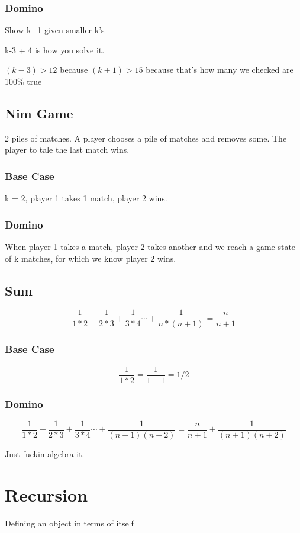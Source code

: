 \documentclass{report}
\begin{document}
\subsection{Domino}
Show k+1 given smaller k's

k-3 + 4 is how you solve it.

$(k - 3) > 12$ because $(k+1) > 15$ because that's how many we checked are 100\% true

\section{Nim Game}
2 piles of matches. A player chooses a pile of matches and removes some. The player to tale the last match wins.

\subsection{Base Case}
k = 2, player 1 takes 1 match, player 2 wins.

\subsection{Domino}
When player 1 takes a match, player 2 takes another and we reach a game state of k matches, for which we know player 2 wins.

\section{Sum}
\[
\frac{1}{1*2} + \frac{1}{2*3} + \frac{1}{3*4} \cdots + \frac{1}{n*(n+1)} = \frac{n}{n+1}
\]

\subsection{Base Case}
\[
\frac{1}{1*2} = \frac{1}{1+1} = 1/2
\]


\subsection{Domino}
\[
\frac{1}{1*2} + \frac{1}{2*3} + \frac{1}{3*4} \cdots + \frac{1}{(n+1)(n+2)} = \frac{n}{n+1} + \frac{1}{(n+1)(n+2)}
\]

Just fuckin algebra it.



\chapter{Recursion}
Defining an object in terms of itself
\end{document}
